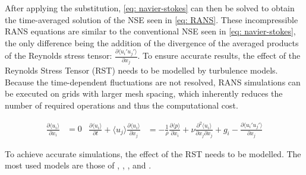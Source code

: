 After applying the substitution, \autoref{eq: navier-stokes} can then be solved to obtain the time-averaged solution of the NSE seen in \ref{eq: RANS}. These incompressible RANS equations are similar to the conventional NSE seen in \autoref{eq: navier-stokes}, the only difference being the addition of the divergence of the averaged products of the Reynolds stress tensor: $\frac{\partial \langle u_i' u_j' \rangle}{\partial x_j}$. To ensure accurate results, the effect of the Reynolds Stress Tensor (RST) needs to be modelled by turbulence models. Because the time-dependent fluctuations are not resolved, RANS simulations can be executed on grids with larger mesh spacing, which inherently reduces the number of required operations and thus the computational cost. 

\begin{subequations} \label{eq: RANS}

    \begin{equation} \label{eq: RANSCont}
    \begin{aligned}
    \frac{\partial \langle u_i \rangle}{\partial x_i} &= 0
    \end{aligned}
    \end{equation}

    \begin{equation} \label{eq: RANSMomentum}
    \begin{aligned}
   \frac{\partial \langle u_i \rangle}{\partial t} 
   + 
   \langle u_j \rangle \frac{\partial \langle u_i \rangle}{\partial x_j} 
   &= 
   -\frac{1}{\rho} \frac{\partial \langle p \rangle}{\partial x_i} 
   + 
   \nu \frac{\partial^2 \langle u_i \rangle}{\partial x_j \partial x_j}
   + 
   g_i
    -
   \frac{\partial \langle u_i' u_j' \rangle}{\partial x_j}
    \end{aligned}
    \end{equation}
\end{subequations}


To achieve accurate simulations, the effect of the RST needs to be modelled. The most used models are those of \textcite{Launder1974}, \textcite{Wilcox1988}, \textcite{Spalart1992e}, \textcite{Launder1975} and \textcite{Speziale1991}. 


